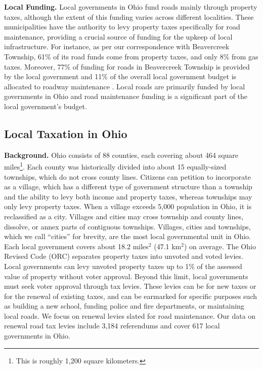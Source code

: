 {\bf Local Funding.} Local governments in Ohio fund roads mainly through property taxes, although the extent of this funding varies across different localities. These municipalities have the authority to levy property taxes specifically for road maintenance, providing a crucial source of funding for the upkeep of local infrastructure. For instance, as per our correspondence with Beavercreek Township, 61\% of its road funds come from property taxes, and only 8\% from gas taxes. Moreover, 77\% of funding for roads in Beavercreek Township is provided by the local government and 11\% of the overall local government budget is allocated to roadway maintenance \citep{schroeder2025}. Local roads are primarily funded by local governments in Ohio and road maintenance funding is a significant part of the local government's budget.


\subsection{Local Taxation in Ohio}

{\bf Background.} Ohio consists of 88 counties, each covering about 464 square miles\footnote{This is roughly 1,200 square kilometers.}. Each county was historically divided into about 15 equally-sized townships, which do not cross county lines. Citizens can petition to incorporate as a village, which has a different type of government structure than a township and the ability to levy both income and property taxes, whereas townships may only levy property taxes. When a village exceeds 5,000 population in Ohio, it is reclassified as a city. Villages and cities may cross township and county lines, dissolve, or annex parts of contiguous townships. Villages, cities and townships, which we call “cities” for brevity, are the most local governmental unit in Ohio. Each local government covers about 18.2 miles$^2$ (47.1 km$^2$) on average. The Ohio Revised Code (ORC) separates property taxes into unvoted and voted levies. Local governments can levy unvoted property taxes up to 1\% of the assessed value of property without voter approval. Beyond this limit, local governments must seek voter approval through tax levies. These levies can be for new taxes or for the renewal of existing taxes, and can be earmarked for specific purposes such as building a new school, funding police and fire departments, or maintaining local roads. We focus on renewal levies slated for road maintenance. Our data on renewal road tax levies include 3,184 referendums and cover 617 local governments in Ohio.


